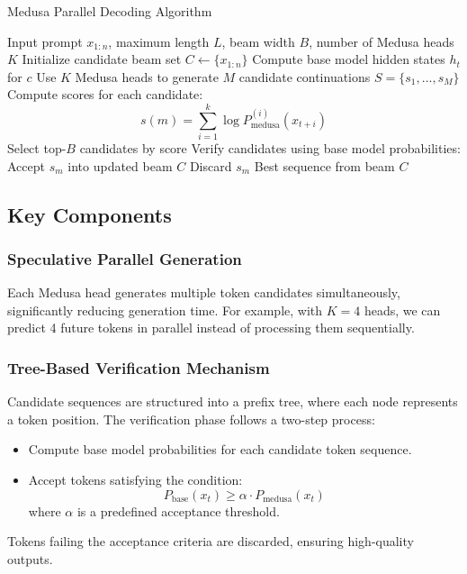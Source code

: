 \documentclass{article}
\begin{document}
\begin{algorithm}
\caption{Medusa Parallel Decoding Algorithm}
\begin{algorithmic}[1]
\REQUIRE Input prompt $x_{1:n}$, maximum length $L$, beam width $B$, number of Medusa heads $K$
\STATE Initialize candidate beam set $C \leftarrow \{ x_{1:n} \}$
        \STATE Compute base model hidden states $h_t$ for $c$
        \STATE Use $K$ Medusa heads to generate $M$ candidate continuations $S = \{s_1, ..., s_M\}$
        \STATE Compute scores for each candidate:
        \begin{equation}
        s(m) = \sum_{i=1}^{k} \log P_{\text{medusa}}^{(i)}(x_{t+i})
        \end{equation}
    \ENDFOR
    \STATE Select top-$B$ candidates by score
    \STATE Verify candidates using base model probabilities:
            \STATE Accept $s_m$ into updated beam $C$
        \ELSE
            \STATE Discard $s_m$
        \ENDIF
    \ENDFOR
\ENDWHILE
\RETURN Best sequence from beam $C$
\end{algorithmic}
\end{algorithm}

\subsection{Key Components}

\subsubsection{Speculative Parallel Generation}
Each Medusa head generates multiple token candidates simultaneously, significantly reducing generation time. For example, with $K=4$ heads, we can predict 4 future tokens in parallel instead of processing them sequentially.

\subsubsection{Tree-Based Verification Mechanism}
Candidate sequences are structured into a prefix tree, where each node represents a token position. The verification phase follows a two-step process:
\begin{itemize}
    \item Compute base model probabilities for each candidate token sequence.
    \item Accept tokens satisfying the condition:
    \begin{equation}
        P_{\text{base}}(x_t) \geq \alpha \cdot P_{\text{medusa}}(x_t)
    \end{equation}
    where $\alpha$ is a predefined acceptance threshold.
\end{itemize}
Tokens failing the acceptance criteria are discarded, ensuring high-quality outputs.
\end{document}
